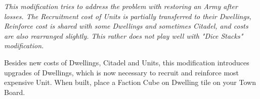 
\textit{This modification tries to address the problem with restoring an Army after losses. The Recruitment cost of Units is partially transferred to their Dwellings, Reinforce cost is shared with some Dwellings and sometimes Citadel,  and  costs are also rearranged slightly. This rather does not play well with "Dice Stacks" modification.}

\begin{multicols*}{2}
    Besides new costs of Dwellings, Citadel and Units, this modification introduces upgrades of  Dwellings, which is now necessary to recruit and reinforce most expensive  Unit. When built, place a Faction Cube on  Dwelling tile on your Town Board.
\end{multicols*}
